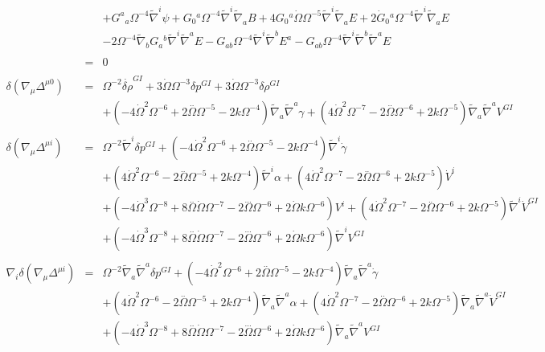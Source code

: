 \documentclass[10pt,letterpaper]{article}
\numberwithin{equation}{section}
\begin{document}
\begin{eqnarray}
&& + G^{a}{}_{a} \Omega^{-4} \tilde{\nabla}^{i}\psi + G_{0}{}^{a} \Omega^{-4} \tilde{\nabla}^{i}\tilde{\nabla}_{a}B + 4 G_{0}{}^{a} \dot{\Omega} \Omega^{-5} \tilde{\nabla}^{i}\tilde{\nabla}_{a}E + 2 \dot{G}_{0}{}^{a} \Omega^{-4} \tilde{\nabla}^{i}\tilde{\nabla}_{a}E \nonumber \\ 
&& - 2 \Omega^{-4} \tilde{\nabla}_{b}G_{a}{}^{b} \tilde{\nabla}^{i}\tilde{\nabla}^{a}E -  G_{ab} \Omega^{-4} \tilde{\nabla}^{i}\tilde{\nabla}^{b}E^{a} -  G_{ab} \Omega^{-4} \tilde{\nabla}^{i}\tilde{\nabla}^{b}\tilde{\nabla}^{a}E
\\  \nonumber\\ 
&=&0
\\ \nonumber\\
\delta(\nabla_\mu \Delta^{\mu 0})&=& \Omega^{-2} \dot{\delta \rho}^{GI}{} + 3 \dot{\Omega} \Omega^{-3} \delta p^{GI}{} + 3 \dot{\Omega} \Omega^{-3} \delta \rho^{GI}{} \nonumber \\ 
&& + (-4 \dot{\Omega}^2 \Omega^{-6} + 2 \overset{..}{\Omega} \Omega^{-5} - 2 k \Omega^{-4}) \tilde{\nabla}_{a}\tilde{\nabla}^{a}\gamma +(4 \dot{\Omega}^2 \Omega^{-7} - 2 \overset{..}{\Omega} \Omega^{-6} + 2 k \Omega^{-5}) \tilde{\nabla}_{a}\tilde{\nabla}^{a}V^{GI}{}
\\  \nonumber\\ 
\delta(\nabla_\mu \Delta^{\mu i})&=& \Omega^{-2} \tilde{\nabla}^{i}\delta p^{GI}{} + (-4 \dot{\Omega}^2 \Omega^{-6} + 2 \overset{..}{\Omega} \Omega^{-5} - 2 k \Omega^{-4}) \tilde{\nabla}^{i}\dot{\gamma} \nonumber \\ 
&& + (4 \dot{\Omega}^2 \Omega^{-6} - 2 \overset{..}{\Omega} \Omega^{-5} + 2 k \Omega^{-4}) \tilde{\nabla}^{i}\alpha +(4 \dot{\Omega}^2 \Omega^{-7} - 2 \overset{..}{\Omega} \Omega^{-6} + 2 k \Omega^{-5}) \dot{V}^{i} \nonumber \\ 
&& + (-4 \dot{\Omega}^3 \Omega^{-8} + 8 \overset{..}{\Omega} \dot{\Omega} \Omega^{-7} - 2 \overset{...}{\Omega} \Omega^{-6} + 2 \dot{\Omega} k \Omega^{-6}) V^{i} + (4 \dot{\Omega}^2 \Omega^{-7} - 2 \overset{..}{\Omega} \Omega^{-6} + 2 k \Omega^{-5}) \tilde{\nabla}^{i}\dot{V}^{GI}{} \nonumber \\ 
&& + (-4 \dot{\Omega}^3 \Omega^{-8} + 8 \overset{..}{\Omega} \dot{\Omega} \Omega^{-7} - 2 \overset{...}{\Omega} \Omega^{-6} + 2 \dot{\Omega} k \Omega^{-6}) \tilde{\nabla}^{i}V^{GI}{}
\\  \nonumber\\ 
\nabla_i \delta(\nabla_\mu \Delta^{\mu i})&=& \Omega^{-2} \tilde{\nabla}_{a}\tilde{\nabla}^{a}\delta p^{GI}{} + (-4 \dot{\Omega}^2 \Omega^{-6} + 2 \overset{..}{\Omega} \Omega^{-5} - 2 k \Omega^{-4}) \tilde{\nabla}_{a}\tilde{\nabla}^{a}\dot{\gamma} \nonumber \\ 
&& + (4 \dot{\Omega}^2 \Omega^{-6} - 2 \overset{..}{\Omega} \Omega^{-5} + 2 k \Omega^{-4}) \tilde{\nabla}_{a}\tilde{\nabla}^{a}\alpha +(4 \dot{\Omega}^2 \Omega^{-7} - 2 \overset{..}{\Omega} \Omega^{-6} + 2 k \Omega^{-5}) \tilde{\nabla}_{a}\tilde{\nabla}^{a}\dot{V}^{GI}{} \nonumber \\ 
&& + (-4 \dot{\Omega}^3 \Omega^{-8} + 8 \overset{..}{\Omega} \dot{\Omega} \Omega^{-7} - 2 \overset{...}{\Omega} \Omega^{-6} + 2 \dot{\Omega} k \Omega^{-6}) \tilde{\nabla}_{a}\tilde{\nabla}^{a}V^{GI}{}
\end{eqnarray}
\end{document}
